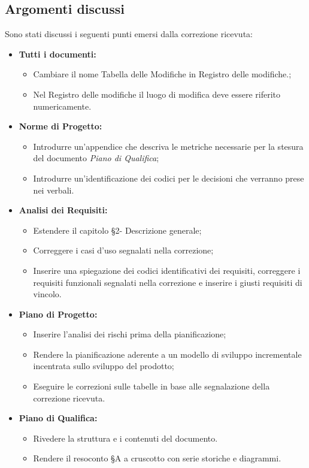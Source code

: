 \documentclass[a4paper,12pt]{article}
\begin{document}
	\subsection{Argomenti discussi}
	Sono stati discussi i seguenti punti emersi dalla correzione ricevuta:
	\begin{itemize}		
		\item \textbf{Tutti i documenti:} 
			\begin{itemize}
				\item Cambiare il nome Tabella delle Modifiche in Registro delle modifiche.;
				\item Nel Registro delle modifiche il luogo di modifica deve essere riferito numericamente.
			\end{itemize}
		\item \textbf{Norme di Progetto:} 
		\begin{itemize}
			\item Introdurre un'appendice che descriva le metriche necessarie per la stesura del documento \textit{Piano di Qualifica};
			\item Introdurre un'identificazione dei codici per le decisioni che verranno prese nei verbali.
		\end{itemize}
	   	\item \textbf{Analisi dei Requisiti:} 
	   	\begin{itemize}
	   		\item Estendere il capitolo §2- Descrizione generale;
	   		\item Correggere i casi d'uso segnalati nella correzione;
	   		\item Inserire una spiegazione dei codici identificativi dei requisiti, correggere i requisiti funzionali segnalati nella correzione e inserire i giusti requisiti di vincolo.
		\end{itemize}
     	\item \textbf{Piano di Progetto:} 
     	\begin{itemize}
     		\item Inserire l'analisi dei rischi prima della pianificazione;
     		\item Rendere la pianificazione aderente a un modello di sviluppo incrementale incentrata sullo sviluppo del prodotto;
     		\item Eseguire le correzioni sulle tabelle in base alle segnalazione della correzione ricevuta.
     	\end{itemize}
     	\item \textbf{Piano di Qualifica:} 
     	\begin{itemize}
     		\item Rivedere la struttura e i contenuti del documento.
     		\item Rendere il resoconto §A a cruscotto con serie storiche e diagrammi.
        \end{itemize}
	\end{itemize}
\end{document}

